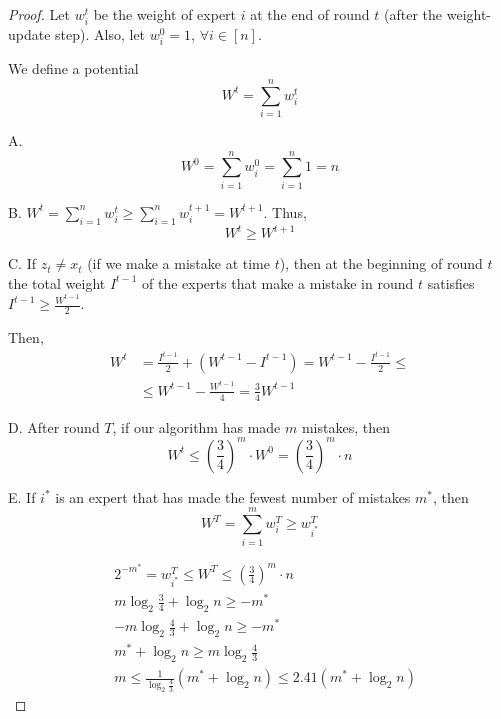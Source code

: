     \begin{proof}
        Let $w_i^t$ be the weight of expert $i$ at the end of round $t$ (after the weight-update step).
        Also, let $w_i^0 = 1$, $\forall i \in [n]$.

        We define a potential
        \[ W^t = \sum_{i=1}^{n} w_i^t \]

        A.
        \[ W^0 = \sum_{i=1}^{n} w_i^0 = \sum_{i=1}^{n} 1 = n \]

        B. $W^t = \sum_{i=1}^{n} w_i^t \geq \sum_{i=1}^{n} w_i^{t+1} = W^{t+1}$.
        Thus,
        \[ W^t \geq W^{t+1} \]

        C. If $z_t \neq x_t$ (if we make a mistake at time $t$), then at the beginning of round $t$ the total weight $I^{t-1}$ of the experts that make a mistake in round $t$ satisfies $I^{t-1} \geq \frac{W^{t-1}}{2}$.

        Then,
        \begin{equation*}
            \begin{split}
                W^t &= \frac{I^{t-1}}{2} + (W^{t-1} - I^{t-1}) = W^{t-1} - \frac{I^{t-1}}{2} \leq\\
                    &\leq W^{t-1} - \frac{W^{t-1}}{4} = \frac{3}{4} W^{t-1}
            \end{split}
        \end{equation*}

        D. After round $T$, if our algorithm has made $m$ mistakes, then
        \[ W^t \leq \left( \frac{3}{4} \right)^m \cdot W^0 = \left( \frac{3}{4} \right)^m \cdot n \]

        E. If $i^*$ is an expert that has made the fewest number of mistakes $m^*$, then
        \[ W^T = \sum_{i=1}^{m} w_i^T \geq w_{i^*}^T \]

        \begin{equation*}
            \begin{split}
                &2^{-m^*} = w_{i^*}^T \leq W^T \leq \left( \frac{3}{4} \right)^m \cdot n\\
                &m \log_2 \frac{3}{4} + \log_2 n \geq -m^*\\
                &-m \log_2 \frac{4}{3} + \log_2 n \geq -m^*\\
                &m^* + \log_2 n \geq m \log_2 \frac{4}{3}\\
                &m \leq \frac{1}{\log_2 \frac{4}{3}} (m^* + \log_2 n) \leq 2.41(m^* + \log_2 n)
            \end{split}
        \end{equation*}
    \end{proof}

